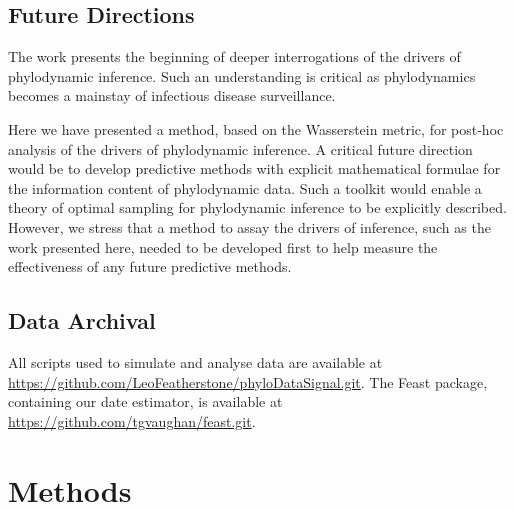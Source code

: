\documentclass{article}
\begin{document}
\subsection*{Future Directions}
The work presents the beginning of deeper interrogations of the drivers of phylodynamic inference. Such an understanding is critical as phylodynamics becomes a mainstay of infectious disease surveillance.

Here we have presented a method, based on the Wasserstein metric, for post-hoc analysis of the drivers of phylodynamic inference. A critical future direction would be to develop predictive methods with explicit mathematical formulae for the information content of phylodynamic data. Such a toolkit would enable a theory of optimal sampling for phylodynamic inference to be explicitly described. However, we stress that a method to assay the drivers of inference, such as the work presented here, needed to be developed first to help measure the effectiveness of any future predictive methods. 
    
\subsection*{Data Archival}
All scripts used to simulate and analyse data are available at \url{https://github.com/LeoFeatherstone/phyloDataSignal.git}. The Feast package, containing our date estimator, is available at \url{https://github.com/tgvaughan/feast.git}.
\section*{Methods}
\end{document}
